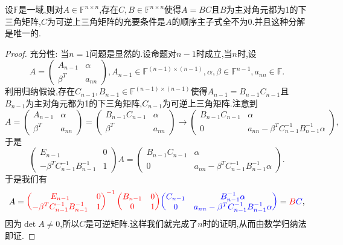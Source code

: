 \documentclass[../../main.tex]{subfiles}
\begin{document}
\begin{theorem}[LU分解]\label{theorem:LU分解}
设\(\mathbb{F}\)是一域,则对\(A \in \mathbb{F}^{n \times n}\),存在\(C,B \in \mathbb{F}^{n \times n}\)使得\(A = BC\)且\(B\)为主对角元都为1的下三角矩阵,\(C\)为可逆上三角矩阵的充要条件是\(A\)的顺序主子式全不为0.并且这种分解是唯一的.
\end{theorem}
\begin{proof}
{\heiti 充分性:} 当\(n = 1\)问题是显然的.设命题对\(n - 1\)时成立,当\(n\)时,设
\[
A = \begin{pmatrix}
A_{n - 1} & \alpha \\
\beta^T & a_{nn}
\end{pmatrix}, A_{n - 1} \in \mathbb{F}^{(n - 1) \times (n - 1)}, \alpha, \beta \in \mathbb{F}^{n - 1}, a_{nn} \in \mathbb{F}.
\]
利用归纳假设,存在\(C_{n - 1}, B_{n - 1} \in \mathbb{F}^{(n - 1) \times (n - 1)}\)使得\(A_{n - 1} = B_{n - 1}C_{n - 1}\)且\(B_{n - 1}\)为主对角元都为1的下三角矩阵,\(C_{n - 1}\)为可逆上三角矩阵.注意到
\[
A = \begin{pmatrix}
A_{n - 1} & \alpha \\
\beta^T & a_{nn}
\end{pmatrix} = \begin{pmatrix}
B_{n - 1}C_{n - 1} & \alpha \\
\beta^T & a_{nn}
\end{pmatrix} \to \begin{pmatrix}
B_{n - 1}C_{n - 1} & \alpha \\
0 & a_{nn} - \beta^T C_{n - 1}^{-1} B_{n - 1}^{-1} \alpha
\end{pmatrix},
\]
于是
\[
\begin{pmatrix}
E_{n - 1} & 0 \\
-\beta^T C_{n - 1}^{-1} B_{n - 1}^{-1} & 1
\end{pmatrix} A = \begin{pmatrix}
B_{n - 1}C_{n - 1} & \alpha \\
0 & a_{nn} - \beta^T C_{n - 1}^{-1} B_{n - 1}^{-1} \alpha
\end{pmatrix}.
\]
于是我们有
\[
A = {\color{red} \begin{pmatrix}
E_{n - 1} & 0 \\
-\beta^T C_{n - 1}^{-1} B_{n - 1}^{-1} & 1
\end{pmatrix}^{-1} \begin{pmatrix}
B_{n - 1} & 0 \\
0 & 1
\end{pmatrix}} {\color{blue} \begin{pmatrix}
C_{n - 1} & B_{n - 1}^{-1} \alpha \\
0 & a_{nn} - \beta^T C_{n - 1}^{-1} B_{n - 1}^{-1} \alpha
\end{pmatrix}} = {\color{red} B}{\color{blue} C},
\]
因为\(\det A \neq 0\),所以\(C\)是可逆矩阵.这样我们就完成了\(n\)时的证明,从而由数学归纳法即证.


\end{proof}
\end{document}

